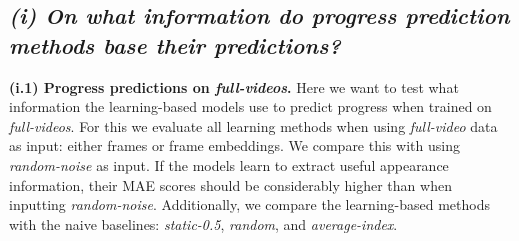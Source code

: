 \subsection{\textbf{\emph{(i) On what information do progress prediction methods base their predictions?}}}
\noindent\textbf{(i.1) Progress predictions on \textsl{full-videos}.}
Here we want to test what information the learning-based models use to predict progress when trained on \textsl{full-videos}.
For this we evaluate all learning methods when using \textsl{full-video} data as input: \ie either frames or frame embeddings.
We compare this with using \textsl{random-noise} as input. 
If the models learn to extract useful appearance information, their MAE scores should be considerably higher than when inputting \textsl{random-noise}.
Additionally, we compare the learning-based methods with the naive baselines: \textsl{static-0.5}, \textsl{random}, and \textsl{average-index}.

